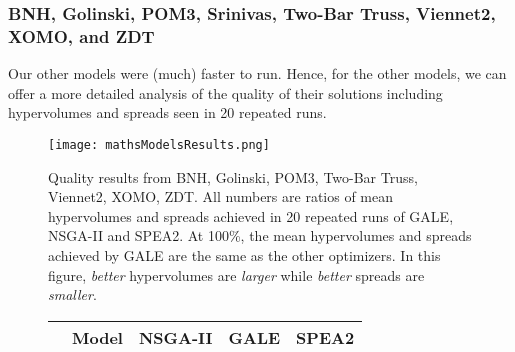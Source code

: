\documentclass[10pt,journal,compsoc]{IEEEtran}
\newenvironment{changed}{\par\color{MyDarkBlue}}{\par}
\begin{document}
\begin{changed}
\subsubsection{BNH, Golinski, POM3, 
Srinivas, 
Two-Bar Truss, Viennet2, XOMO, and ZDT}

Our other models   were (much)
faster to run.  Hence, for  the other models, we
can offer a more detailed analysis of the quality of
their solutions including hypervolumes and spreads
seen in 20 repeated runs.
\begin{figure}
\texttt{[image: mathsModelsResults.png]}
\caption{Quality results from BNH, Golinski, POM3, Two-Bar Truss, Viennet2, XOMO, ZDT.
All numbers are ratios of mean hypervolumes and spreads achieved in 20 repeated runs of GALE, NSGA-II and SPEA2.
At 100\%, the mean hypervolumes and spreads achieved by GALE are the same as the other optimizers.
In this figure,  {\em better} hypervolumes are {\em larger} while {\em better} spreads are {\em smaller}.}\label{fig:rmodels}
\end{figure}
\begin{figure}[!t]
\scriptsize
\centering
\begin{tabular}{|r|c|c|c|c|} \hline
	&	Model	&	NSGA-II	&	GALE	&	SPEA2	\\ \hline

\end{tabular}
\end{figure}
\end{changed}
\end{document}
